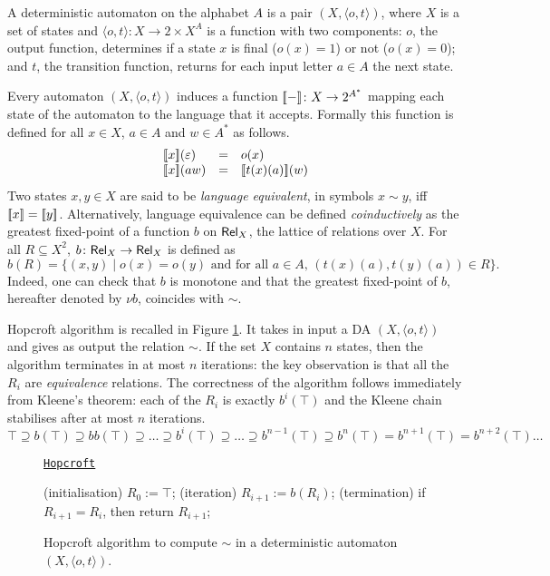 \documentclass[smallcondensed,envcountsect,envcountsame]{svjour3}     %
\begin{document}
A deterministic automaton on the alphabet $A$ is a pair $(X,\langle
o,t\rangle )$, where $X$ is a set of states and $\langle o,t\rangle
\colon X \to 2\times X^A$ is a function with two components: $o$, the
output function, determines if a state $x$ is final ($o(x) = 1$) or
not ($o(x) = 0$); and $t$, the transition function, returns for each
input letter $a \in A$ the next state.

Every automaton $(X,\langle o,t\rangle)$ induces a function
$[\![ - ]\!]\colon X \to 2^{A^*}$ mapping each state of the automaton
to the language that it accepts. Formally this function is defined for all $x\in
X$, $a \in A$ and $w\in A^*$ as follows.
%
\[
\begin{array}{lcl}
\bb{x}(\varepsilon) &=&  o(x) \\
\bb{x}(aw)       &=&    \bb{t(x)(a)}(w)
\end{array}
\]
%
Two states $x,y\in X$ are said to be \emph{language equivalent}, in symbols
$x \sim y$, iff  $[\![ x ]\!]=[\![ y ]\!]$.
Alternatively, language equivalence can be defined \emph{coinductively} as the greatest
fixed-point of a function $b$ on $\mathsf{Rel}_X$, the lattice of relations
over $X$.  For all $R\subseteq X^2$, $b\colon \mathsf{Rel}_X \to \mathsf{Rel}_X$ is
defined as
%
\begin{equation}\label{eq:functional-bisim-da}
b(R)=\{(x,y) \mid o(x)=o(y) \text{ and for all } a\in A, \, (t(x)(a), t(y)(a))\in R  \}\text{.}
\end{equation}
%
Indeed, one can check that $b$ is monotone and that the greatest
fixed-point of $b$, hereafter denoted by $\nu b$, coincides with
$\sim$. 

Hopcroft algorithm is recalled in Figure \ref{fig:hopcroft}. It takes in input a DA $(X,\langle o,t\rangle )$  and gives as output the relation $\sim$.
If the set $X$ contains $n$ states, then the algorithm  terminates in at most $n$ iterations: the key observation is that all the $R_i$ are \emph{equivalence} relations.
The correctness of the algorithm follows immediately from Kleene's theorem: each of the $R_i$ is exactly $b^i(\top)$ and the Kleene chain stabilises after at most $n$ iterations.
$$\top \supseteq b(\top) \supseteq bb(\top) \supseteq \dots \supseteq b^i(\top) \supseteq \dots \supseteq b^{n-1}(\top) \supseteq b^n(\top) = b^{n+1}(\top) = b^{n+2}(\top) \dots$$


\begin{figure}[t]
\centering
\underline{\texttt{Hopcroft}}
\begin{codeNT}
(initialisation) $R_0 := \top$; 
(iteration) $R_{i+1} := b(R_i)$; 
(termination) if  $R_{i+1} = R_{i}$, then return $R_{i+1}$; 
\end{codeNT}
\caption{Hopcroft algorithm to compute $\sim$ in a deterministic automaton $(X,\langle o,t\rangle )$.}
\label{fig:hopcroft}
\end{figure}
\end{document}

